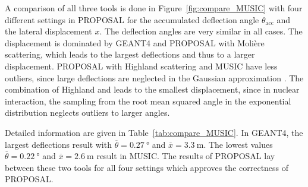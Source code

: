 \documentclass[pdflatex, sn-mathphys]{sn-jnl}%
\theoremstyle{thmstyleone}%
\theoremstyle{thmstyletwo}%
\theoremstyle{thmstylethree}%
\begin{document}
A comparison of all three tools is done in Figure~\ref{fig:compare_MUSIC} 
with four different settings in PROPOSAL for the 
accumulated deflection angle $\theta_{\text{acc}}$ and the lateral displacement
$x$. The deflection angles are very similar in all cases. The 
displacement is dominated by GEANT4 and PROPOSAL with Molière scattering, which 
leads to the largest deflections and thus to a larger displacement. 
PROPOSAL with Highland scattering and MUSIC have less outliers, since large 
deflections are neglected in the Gaussian approximation \cite{HIGHLAND_1975}. 
The combination of Highland and \cite{Van_Ginneken} leads to the smallest 
displacement, since in nuclear interaction, the sampling from the root mean squared angle in the 
exponential distribution neglects outliers to larger angles.

Detailed information are given in Table~\ref{tab:compare_MUSIC}. In GEANT4, the 
largest deflections result with $\overline{\theta} = \SI{0.27}{\degree}$ 
and $\overline{x} = \SI{3.3}{\meter}$. The lowest values $\overline{\theta} = \SI{0.22}{\degree}$ and 
$\overline{x} = \SI{2.6}{\meter}$ result in MUSIC. The results of PROPOSAL lay between 
these two tools for all four settings which approves the 
correctness of PROPOSAL.
\end{document}
